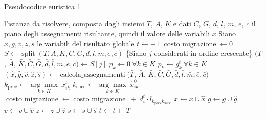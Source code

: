\begin{algorithm}
    \caption{Pseudocodice euristica 1}
    \label{alg:euristica-sempl}
    \begin{algorithmic}[1]
        \Require l'istanza da risolvere, composta dagli insiemi $T$, $A$, $K$ e dati $C$, $G$, $d$, $l$, $m$, $e$, $c$
        \Ensure il piano degli assegnamenti risultante, quindi il valore delle variabili $x$
        \State Siano $x, g, v, z, s$ le variabili del risultato globale
        \State $t \gets -1$
        \State $\operatorname{costo\_migrazione} \gets 0$
        \State $S \gets \operatorname{split}(T, A, K, C, G, d, l, m, e, c)$ \label{algo:l:split}
            \State \{Siano $j$ considerati in ordine crescente\}
            \State $(\bar{T}$, $\bar{A}$, $\bar{K}, \bar{C}, \bar{G}, \bar{d}, \bar{l}, \bar{m}, \bar{e}, \bar{c}) \gets S[j]$ \label{algo:l:dati1}
             \label{algo:l:p1}
                \State $p_k \gets 0 ~ \forall k \in K$
            \Else
                \State $p_k \gets g^t_k ~ \forall k \in K$
            \EndIf
            \State $(\hat{x}, \hat{g}, \hat{v}, \hat{z}, \hat{s}) \gets \operatorname{calcola\_assegnamenti}(\bar{T}$, $\bar{A}$, $\bar{K}, \bar{C}, \bar{G}, \bar{d}, \bar{l}, \bar{m}, \bar{e}, \bar{c})$ \label{algo:l:calcola-ass}
                 \label{algo:l:costi-migr1}
                \State $k_{\operatorname{prec}} \gets \underset{k \in K}{\arg\max} ~ x^t_{ik}$
                \State $k_{\operatorname{succ}} \gets \underset{k \in K}{\arg\max} ~ \hat{x}^0_{ik}$
                        \State $\operatorname{costo\_migrazione} \gets \operatorname{costo\_migrazione} ~ + ~ d^t_i \cdot l_{k_{\operatorname{prev}} k_{\operatorname{succ}}}$
                    \EndIf
                \EndFor
            \EndIf
            \State $x \gets x \cup \hat{x}$ \label{algo:l:acc1}
            \State $g \gets g \cup \hat{g}$
            \State $v \gets v \cup \hat{v}$
            \State $z \gets z \cup \hat{z}$
            \State $s \gets s \cup \hat{s}$
            \State $t \gets t + |T|$
        \EndFor
    \end{algorithmic}
\end{algorithm}
